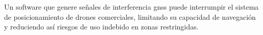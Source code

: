 
\begin{justify}
    Un software que genere señales de interferencia \gls{gnss} puede interrumpir el sistema de posicionamiento de drones comerciales,
    limitando su capacidad de navegación y reduciendo así riesgos de uso indebido en zonas restringidas.
\end{justify}